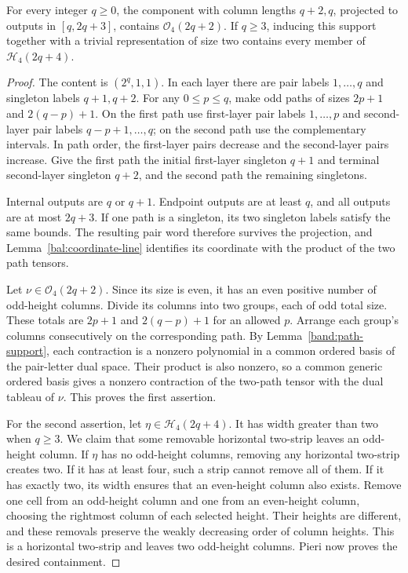 \begin{lemma}
\label{bal:two-paths}
For every integer $q\ge0$, the component with column lengths
$q+2,q$, projected to outputs
in $[q,2q+3]$, contains $\mathcal O_4(2q+2)$.  If $q\ge3$,
inducing this support together with a trivial representation of
size two contains every member of $\mathcal H_4(2q+4)$.
\end{lemma}

\begin{proof}
The content is $(2^q,1,1)$.  In each layer there are pair labels
$1,\ldots,q$ and singleton labels $q+1,q+2$.
For any $0\le p\le q$, make odd paths of sizes $2p+1$ and
$2(q-p)+1$.  On the first path use first-layer pair labels
$1,\ldots,p$ and second-layer pair labels $q-p+1,\ldots,q$;
on the second path use the complementary intervals.  In path
order, the first-layer pairs decrease and the second-layer pairs
increase.  Give the first path the initial first-layer singleton
$q+1$ and terminal second-layer singleton $q+2$, and the second
path the remaining singletons.

Internal outputs are $q$ or $q+1$.  Endpoint outputs are at least
$q$, and all outputs are at most $2q+3$.  If one path is a
singleton, its two singleton labels satisfy the same bounds.
The resulting pair word therefore survives the projection, and
Lemma~\ref{bal:coordinate-line} identifies its coordinate with
the product of the two path tensors.

Let $\nu\in\mathcal O_4(2q+2)$.  Since its size is even, it has
an even positive number of odd-height columns.  Divide its columns
into two groups, each of odd total size.  These totals are
$2p+1$ and $2(q-p)+1$ for an allowed $p$.  Arrange each group's
columns consecutively on the corresponding path.  By
Lemma~\ref{band:path-support}, each contraction is a nonzero
polynomial in a common ordered basis of the pair-letter dual
space. Their product is also nonzero,
so a common generic ordered basis gives a nonzero contraction of the
two-path tensor with the dual tableau of $\nu$.  This proves the
first assertion.

For the second assertion, let $\eta\in\mathcal H_4(2q+4)$.
It has width greater than two when $q\ge3$.  We claim that some
removable horizontal two-strip leaves an odd-height column.
If $\eta$ has no odd-height columns, removing any horizontal
two-strip creates two.  If it has at least four, such a strip
cannot remove all of them.  If it has exactly two, its width
ensures that an even-height column also exists.  Remove one cell
from an odd-height column and one from an even-height column,
choosing the rightmost column of each selected height.  Their
heights are different, and these removals preserve the weakly
decreasing order of column heights.  This is a horizontal
two-strip and leaves two odd-height columns.  Pieri now proves
the desired containment.
\end{proof}

